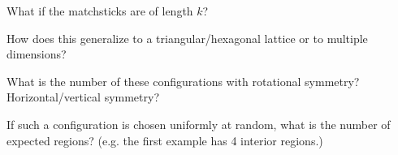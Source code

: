 \documentclass{article}
\begin{document}
  \begin{related}
    \item What if the matchsticks are of length $k$?
    \item How does this generalize to a triangular/hexagonal lattice or to
      multiple dimensions?
    \item What is the number of these configurations with rotational symmetry?
      Horizontal/vertical symmetry?
    \item If such a configuration is chosen uniformly at random, what is the
      number of expected regions? (e.g. the first example has 4 interior
      regions.)
  \end{related}
\end{document}
